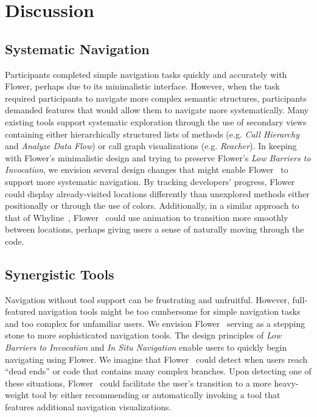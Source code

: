 \documentclass[conference]{IEEEtran}
\newcommand{\toolName}{Flower}
\begin{document}

\section{Discussion}

\subsection{Systematic Navigation}
Participants completed simple navigation tasks quickly and accurately with \toolName, perhaps due to its minimalistic interface.
However, when the task required participants to navigate more complex semantic structures, participants demanded features that would allow them to navigate more systematically.
Many existing tools support systematic exploration through the use of secondary views containing either hierarchically structured lists of methods (e.g. \textit{Call Hierarchy} and \textit{Analyze Data Flow}) or call graph visualizations (e.g. \textit{Reacher}).
In keeping with \toolName's minimalistic design and trying to preserve \toolName's \textit{Low Barriers to Invocation}, we envision several design changes that might enable \toolName~ to support more systematic navigation.
By tracking developers' progress, \toolName~ could display already-visited locations differently than unexplored methods either positionally or through the use of colors.
Additionally, in a similar approach to that of Whyline~\cite{Whyline}, \toolName~ could use animation to transition more smoothly between locations, perhaps giving users a sense of naturally moving through the code.


\subsection{Synergistic Tools}
Navigation without tool support can be frustrating and unfruitful.
However, full-featured navigation tools might be too cumbersome for simple navigation tasks and too complex for unfamiliar users.
We envision \toolName~ serving as a stepping stone to more sophisticated navigation tools. 
The design principles of \textit{Low Barriers to Invocation} and \textit{In Situ Navigation} enable users to quickly begin navigating using \toolName. 
We imagine that \toolName~ could detect when users reach ``dead ends'' or code that contains many complex branches.
Upon detecting one of these situations, \toolName~ could facilitate the user's transition to a more heavy-weight tool by either recommending or automatically invoking a tool that features additional navigation visualizations.
\end{document}
